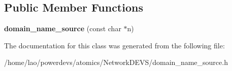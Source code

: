 \subsection*{Public Member Functions}
\begin{DoxyCompactItemize}
\item 
{\bfseries domain\+\_\+name\+\_\+source} (const char $\ast$n)\hypertarget{classdomain__name__source_a76cb055b27491617cad5842617bfe299}{}\label{classdomain__name__source_a76cb055b27491617cad5842617bfe299}

\end{DoxyCompactItemize}


The documentation for this class was generated from the following file\+:\begin{DoxyCompactItemize}
\item 
/home/lao/powerdevs/atomics/\+Network\+D\+E\+V\+S/domain\+\_\+name\+\_\+source.\+h\end{DoxyCompactItemize}
